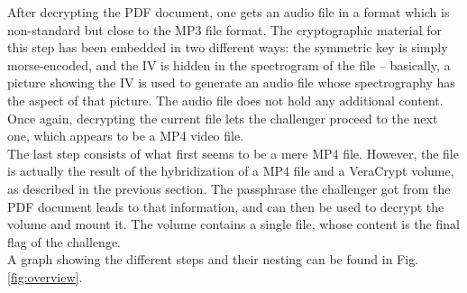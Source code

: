 \documentclass[12pt,a4paper]{article}
\begin{document}
    After decrypting the PDF document, one gets an audio file in a format
    which is non-standard but close to the MP3 file format. The cryptographic
    material for this step has been embedded in two different ways: the
    symmetric key is simply morse-encoded, and the IV is hidden in the
    spectrogram of the file -- basically, a picture showing the IV is used to
    generate an audio file whose spectrography has the aspect of that picture.
    The audio file does not hold any additional content. Once again,
    decrypting the current file lets the challenger proceed to the next
    one, which appears to be a MP4 video file.\\

    The last step consists of what first seems to be a mere MP4 file.
    However, the file is actually the result of the hybridization of a MP4 file
    and a VeraCrypt volume, as described in the previous section. The passphrase
    the challenger got from the PDF document leads to that information, and can
    then be used to decrypt the volume and mount it. The volume contains a
    single file, whose content is the final flag of the challenge.\\



    A graph showing the different steps and their nesting can be found in Fig.\ref{fig:overview}.
\end{document}
